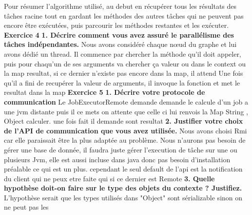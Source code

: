 \documentclass{article}
\begin{document}
Pour résumer l'algorithme utilisé, au debut en récupérer tous les résultats des tâches racine tout en gardant les méthodes 
des autres tâches qui ne peuvent pas encore être exécutées, puis parcourir les méthodes restantes et les exécuter.
\newline
\newline
\textbf{Exercice 4}
\newline
\newline
\textbf{1. Décrire comment vous avez assuré le parallélisme des tâches indépendantes.}
\newline
\newline
Nous avons considéré chaque nœud du graphe et lui avons dédié un thread. Il commence par chercher la 
méthode qu'il doit appeler, puis pour chaqu'un de ses arguments va chercher ça valeur ou dans le context ou la map resultat, si ce dernier n'existe pas encore dans la map, 
il attend Une fois qu'il a fini de recupérer la valeur de arguments, il invoque la fonction et met le resultat dans la map
\newline
\newline
\textbf{Exercice 5}
\newline
\newline
\textbf{1. Décrire votre protocole de communication}
\newline
\newline
Le JobExecutorRemote demande demande le calcule d'un job a une jvm distante puis il ce mets on attente
que celle ci lui renvois la Map String , Object  calculer.
une fois fait il demande sont resultat
\newline
\newline
\textbf{2. Justifier votre choix de l’API de communication que vous avez utilisée.}
\newline
\newline
Nous avons choisi Rmi car elle paraissait être la plus adaptée au problème. Nous n'aurons pas besoin de gérer une base de donnée,
il faudra juste gérer l'execution de tâche sur une ou plusieurs Jvm, elle est aussi incluse dans java donc pas besoin d'installation préalable ce qui est un plus.
cependant le seul default de l'api est la notification du client qui ne peux etre faite qui si ce dernier est Remote
\newline
\newline
\textbf{3. Quelle hypothèse doit-on faire sur le type des objets du contexte ? Justifiez.}
\newline
\newline
L'hypothèse serait que les types utilisés dans "Object" sont sérializable sinon on ne peut pas les 
\end{document}
